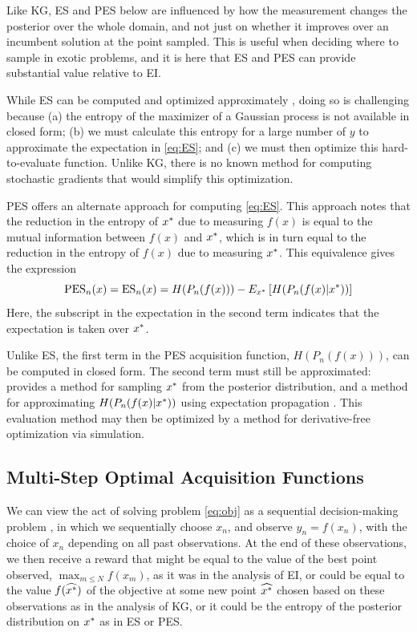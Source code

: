 \documentclass{article}
\begin{document}
Like KG, ES and PES below are influenced by how the measurement changes the posterior over the whole domain, and not just on whether it improves over an incumbent solution at the point sampled.  This is useful when deciding where to sample in exotic problems, and it is here that ES and PES can provide substantial value relative to EI.

While ES can be computed and optimized approximately \citep{hennig2012entropy}, doing so is challenging because
(a) the entropy of the maximizer of a Gaussian process is not available in closed form; (b) we must calculate this entropy for a large number of $y$ to approximate the expectation in \eqref{eq:ES}; and (c) we must then optimize this hard-to-evaluate function.  Unlike KG, there is no known method for computing stochastic gradients that would simplify this optimization.

PES offers an alternate approach for computing \eqref{eq:ES}.  This approach notes that the reduction in the entropy of $x^*$ due to measuring $f(x)$ is equal to the mutual information between $f(x)$ and $x^*$, which is in turn equal to the reduction in the entropy of $f(x)$ due to measuring $x^*$.  This equivalence gives the expression
\begin{equation} 
\mathrm{PES}_n(x) = 
\mathrm{ES}_n(x) = H(P_n(f(x))) - E_{x^*}\left[H(P_n(f(x) | x^*))\right]
\end{equation} 
Here, the subscript in the expectation in the second term indicates that the expectation is taken over $x^*$.

Unlike ES, the first term in the PES acquisition function, $H(P_n(f(x)))$, can be computed in closed form.  The second term must still be approximated: \cite{hernandez2014predictive} provides a method for sampling $x^*$ from the posterior distribution, and a method for approximating $H(P_n(f(x) | x^*))$ using expectation propagation \citep{minka2001family}.  This evaluation method may then be optimized by a method for derivative-free optimization via simulation.

\subsection{Multi-Step Optimal Acquisition Functions}
\label{sec:multi-step}
We can view the act of solving problem \eqref{eq:obj} as a sequential decision-making problem
\citep{GinsbourgerRiche2010,Frazier2012},
in which we sequentially choose $x_n$, and observe $y_n = f(x_n)$, with the choice of $x_n$ depending on all past observations.
At the end of these observations, we then receive a reward that might be equal to the value of the best point observed, $\max_{m \le N} f(x_m)$, as it was in the analysis of EI, or could be equal to the value $f(\widehat{x^*})$ of the objective at some new point $\widehat{x^*}$ chosen based on these observations as in the analysis of KG, or it could be the entropy of the posterior distribution on $x^*$ as in ES or PES.
\end{document}
